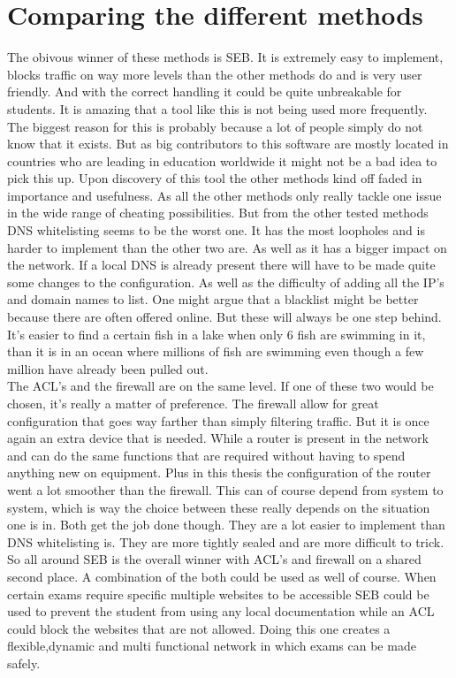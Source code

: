 \section{Comparing the different methods}
The obivous winner of these methods is SEB. It is extremely easy to implement, blocks traffic on way more levels than the other methods do and is very user friendly. And with the correct handling it could be quite unbreakable for students. It is amazing that a tool like this is not being used more frequently. The biggest reason for this is probably because a lot of people simply do not know that it exists. But as big contributors to this software are mostly located in countries who are leading in education worldwide it might not be a bad idea to pick this up.
Upon discovery of this tool the other methods kind off faded in importance and usefulness. As all the other methods only really tackle one issue in the wide range of cheating possibilities. But from the other tested methods DNS whitelisting seems to be the worst one. It has the most loopholes and is harder to implement than the other two are. As well as it has a bigger impact on the network. If a local DNS is already present there will have to be made quite some changes to the configuration. As well as the difficulty  of adding all the IP's and domain names to list. One might argue that a blacklist might be better because there are often offered online. But these will always be one step behind. It's easier to find a certain fish in a lake when only 6 fish are swimming in it, than it is in an ocean where millions of fish are swimming even though a few million have already been pulled out.\\
The ACL's and the firewall are on the same level. If one of these two would be chosen, it's really a matter of preference. The firewall allow for great configuration that goes way farther than simply filtering traffic. But it is once again an extra device that is needed. While a router is present in the network and can do the same functions that are required without having to spend anything new on equipment.  Plus in this thesis the configuration of the router went a lot smoother than the firewall. This can of course depend from system to system, which is way the choice between these really depends on the situation one is in. Both get the job done though. They are a lot easier to implement than DNS whitelisting is. They are more tightly sealed and are more difficult to trick.\\
So all around SEB is the overall winner with ACL's and firewall on a shared second place. A combination of the both could be used as well of course. When certain exams require specific multiple websites to be accessible SEB could be used to prevent the student from using any local documentation while an ACL could block the websites that are not allowed. Doing this one creates a flexible,dynamic and multi functional network in which exams can be made safely.
